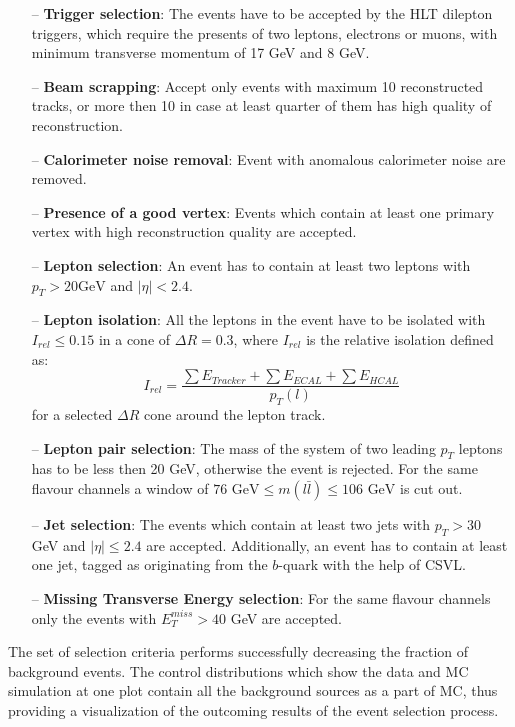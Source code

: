 \begin{itemize}
 \item [--] \textbf{Trigger selection}: The events have to be accepted by the HLT dilepton triggers, which require the presents of two leptons, electrons or muons, with
 minimum transverse momentum of 17 GeV and 8 GeV. 
 \item [--] \textbf{Beam scrapping}: Accept only events with maximum 10 reconstructed tracks, or more then 10 in case at least quarter of them has high quality of reconstruction.
 \item [--] \textbf{Calorimeter noise removal}: Event with anomalous calorimeter noise are removed.
 \item [--] \textbf{Presence of a good vertex}: Events which contain at least one primary vertex with high reconstruction quality are accepted.
 \item [--] \textbf{Lepton selection}: An event has to contain at least two leptons with $p_{T} > 20 \textrm{GeV}$ and $|\eta| < 2.4$.
 \item [--] \textbf{Lepton isolation}: All the leptons in the event have to be isolated with $I_{rel}\leq 0.15$ in a cone of $\Delta R = 0.3$, where
 $I_{rel}$ is the relative isolation defined as:
  \begin{equation}
   I_{rel} = \frac{\sum E_{Tracker} + \sum E_{ECAL} + \sum E_{HCAL}}{p_{T}(l)}
  \end{equation}
 for a selected $\Delta R$ cone around the lepton track.
 \item [--] \textbf{Lepton pair selection}: The mass of the system of two leading $p_{T}$ leptons has to be less then 20 GeV, otherwise the event is rejected. For the
 same flavour channels a window of $76\textrm{ GeV}\leq m(l\bar{l}) \leq 106\textrm{ GeV}$ is cut out.
 \item [--] \textbf{Jet selection}: The events which contain at least two jets with $p_{T} > 30$ GeV and $|\eta| \leq 2.4$ are accepted. Additionally, an event has to contain
 at least one jet, tagged as originating from the $b$-quark with the help of CSVL.
 
 \item [--] \textbf{Missing Transverse Energy selection}: For the same flavour channels only the events with $E_{T}^{miss} > 40$ GeV are accepted.
\end{itemize}

The set of selection criteria performs successfully decreasing the fraction of background events. The control distributions which show the data and MC simulation at one plot
contain all the background sources as a part of MC, thus providing a visualization of the outcoming results of the event selection process. 